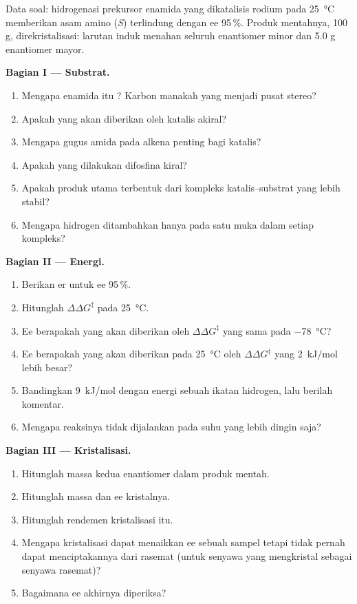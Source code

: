 \begin{problem}
\label{pb:b3:asymmetric-synthesis:1}
Data soal: hidrogenasi prekursor enamida yang dikatalisis rodium
pada \qty{25}{\celsius} memberikan asam amino (\textit{S}) terlindung dengan ee 95\,\%. Produk
mentahnya, 100 g, direkristalisasi: larutan induk menahan seluruh enantiomer
minor dan 5.0 g enantiomer mayor.

\medskip\noindent\textbf{Bagian I --- Substrat.}
\begin{enumerate}[beginpenalty=10000]
  \item Mengapa enamida itu ? Karbon manakah yang menjadi pusat stereo?
  \item Apakah yang akan diberikan oleh katalis akiral?
  \item Mengapa gugus amida pada alkena penting bagi katalis?
  \item Apakah yang dilakukan difosfina kiral?
  \item Apakah produk utama terbentuk dari kompleks katalis--substrat yang lebih
        stabil?
  \item Mengapa hidrogen ditambahkan hanya pada satu muka dalam setiap kompleks?
\end{enumerate}

\medskip\noindent\textbf{Bagian II --- Energi.}
\begin{enumerate}[resume, beginpenalty=10000]
  \item Berikan er untuk ee 95\,\%.
  \item Hitunglah $\Delta\Delta G^\ddagger$ pada \qty{25}{\celsius}.
  \item Ee berapakah yang akan diberikan oleh $\Delta\Delta G^\ddagger$ yang sama pada \qty{-78}{\celsius}?
  \item Ee berapakah yang akan diberikan pada \qty{25}{\celsius} oleh $\Delta\Delta G^\ddagger$ yang \qty{2}{kJ/mol} lebih besar?
  \item Bandingkan \qty{9}{kJ/mol} dengan energi sebuah ikatan hidrogen, lalu berilah komentar.
  \item Mengapa reaksinya tidak dijalankan pada suhu yang lebih dingin saja?
\end{enumerate}

\medskip\noindent\textbf{Bagian III --- Kristalisasi.}
\begin{enumerate}[resume, beginpenalty=10000]
  \item Hitunglah massa kedua enantiomer dalam produk mentah.
  \item Hitunglah massa dan ee kristalnya.
  \item Hitunglah rendemen kristalisasi itu.
  \item Mengapa kristalisasi dapat menaikkan ee sebuah sampel tetapi tidak pernah dapat menciptakannya dari
        rasemat (untuk senyawa yang mengkristal sebagai senyawa rasemat)?
  \item Bagaimana ee akhirnya diperiksa?
\end{enumerate}


\end{problem}
